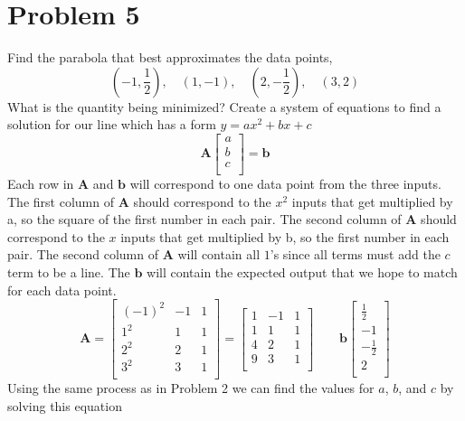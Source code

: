 \documentclass{article}
\begin{document}
\section*{Problem 5}
Find the parabola that best approximates the data points,
$$ (-1,\frac{1}{2}), \quad (1, -1), \quad (2, -\frac{1}{2}), \quad (3,2) $$
What is the quantity being minimized?
\newline
\newline
Create a system of equations to find a solution for our line which has a form $y = ax^2+bx+c$
$$
\mathbf{A}
\begin{bmatrix}
a\\
b\\
c\\
\end{bmatrix}
=
\mathbf{b}
$$
Each row in $\mathbf{A}$ and $\mathbf{b}$ will correspond to one data point from the three inputs.
\newline
The first column of $\mathbf{A}$ should correspond to the $x^2$ inputs that get multiplied by a, so the square of the first number in each pair.
\newline
The second column of $\mathbf{A}$ should correspond to the $x$ inputs that get multiplied by b, so the first number in each pair.
\newline
The second column of $\mathbf{A}$ will contain all $1$'s since all terms must add the $c$ term to be a line.
The $\mathbf{b}$ will contain the expected output that we hope to match for each data point.
$$
\mathbf{A}
=
\begin{bmatrix}
(-1)^2 & -1 & 1 \\
1^2 & 1 & 1 \\
2^2 & 2 & 1 \\
3^2 & 3 & 1 \\
\end{bmatrix}
=
\begin{bmatrix}
1 & -1 & 1 \\
1 & 1 & 1 \\
4 & 2 & 1 \\
9 & 3 & 1 \\
\end{bmatrix}
\qquad
\mathbf{b}
\begin{bmatrix}
\frac{1}{2} \\
-1 \\
-\frac{1}{2} \\
2 \\
\end{bmatrix}
$$
Using the same process as in Problem 2 we can find the values for $a$, $b$, and $c$ by solving this equation
\end{document}
